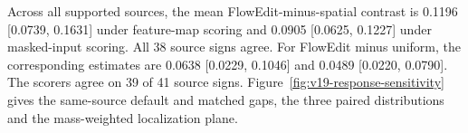 Across all supported sources, the mean FlowEdit-minus-spatial contrast is
0.1196 [0.0739, 0.1631] under feature-map scoring and 0.0905 [0.0625, 0.1227]
under masked-input scoring. All 38 source signs agree. For FlowEdit minus
uniform, the corresponding estimates are 0.0638 [0.0229, 0.1046] and
0.0489 [0.0220, 0.0790]. The scorers agree on 39 of 41 source signs.
Figure~\ref{fig:v19-response-sensitivity} gives the same-source default and matched
gaps, the three paired distributions and the mass-weighted localization plane.
